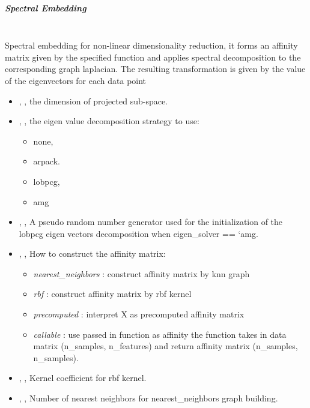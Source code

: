 \subparagraph{Spectral Embedding} \hfil \\
\label{subparagraph:Spectral}
Spectral embedding for non-linear dimensionality reduction, it forms an affinity matrix given by the
 specified function and applies spectral decomposition to the corresponding graph laplacian. The resulting
 transformation is given by the value of the eigenvectors for each data point
\begin{itemize}
	\item {}, , the dimension of projected
	sub-space. 
	\item {}, , the eigen value decomposition
	 strategy to use:
	\begin{itemize}
		\item none,
		\item arpack.
		\item lobpcg,
		\item amg
	\end{itemize}
	\item {}, , A
	pseudo random number generator used for the initialization of the lobpcg eigen vectors
	decomposition when eigen\_solver == ‘amg. 
	\item {}, , How to construct
	 the affinity matrix:
	\begin{itemize}
		\item \textit{nearest\_neighbors} : construct affinity matrix by knn graph
		\item \textit{rbf} : construct affinity matrix by rbf kernel
		\item \textit{precomputed} : interpret X as precomputed affinity matrix
		\item \textit{callable} : use passed in function as affinity the function takes
		 in data matrix (n\_samples, n\_features) and return affinity matrix (n\_samples, n\_samples).
	\end{itemize}
	\item {}, , Kernel coefficient for rbf kernel.
	\item {}, , Number of nearest neighbors for
	 nearest\_neighbors graph building. 
\end{itemize}

